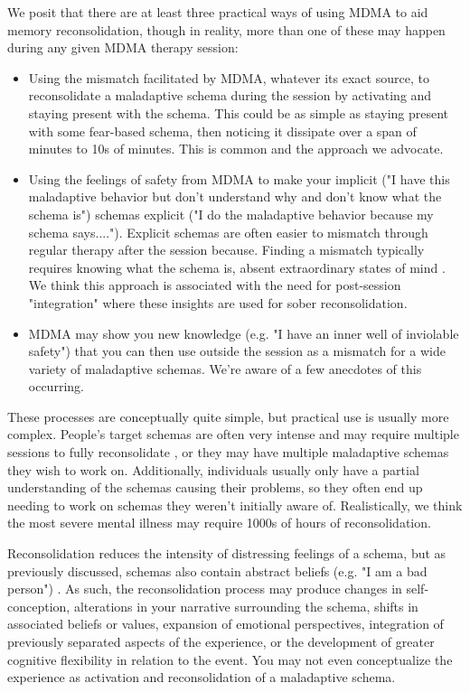 \documentclass[12pt,letterpaper]{book}
\begin{document}
We posit that there are at least three practical ways of using MDMA to aid memory reconsolidation, though in reality, more than one of these may happen during any given MDMA therapy session:
\begin{itemize}
	\item Using the mismatch facilitated by MDMA, whatever its exact source, to reconsolidate a maladaptive schema during the session by activating and staying present with the schema. This could be as simple as staying present with some fear-based schema, then noticing it dissipate over a span of minutes to 10s of minutes. This is common and the approach we advocate.
	\item Using the feelings of safety from MDMA to make your implicit ("I have this maladaptive behavior but don't understand why and don't know what the schema is") schemas explicit ("I do the maladaptive behavior because my schema says...."). Explicit schemas are often easier to mismatch through regular therapy after the session because. Finding a mismatch typically requires knowing what the schema is, absent extraordinary states of mind \cite{eckerUnlocking}. We think this approach is associated with the need for post-session "integration" where these insights are used for sober reconsolidation.
	\item MDMA may show you new knowledge (e.g. "I have an inner well of inviolable safety") that you can then use outside the session as a mismatch for a wide variety of maladaptive schemas. We're aware of a few anecdotes of this occurring.
\end{itemize}
These processes are conceptually quite simple, but practical use is usually more complex. People's target schemas are often very intense and may require multiple sessions to fully reconsolidate \cite{mitchellMDMAClinicalTrial}, or they may have multiple maladaptive schemas they wish to work on. Additionally, individuals usually only have a partial understanding of the schemas causing their problems, so they often end up needing to work on schemas they weren't initially aware of. Realistically, we think the most severe mental illness may require 1000s of hours of reconsolidation.

Reconsolidation reduces the intensity of distressing feelings of a schema, but as previously discussed, schemas also contain abstract beliefs (e.g. "I am a bad person") \cite{laneReconsolidation}. As such, the reconsolidation process may produce changes in self-conception, alterations in your narrative surrounding the schema, shifts in associated beliefs or values, expansion of emotional perspectives, integration of previously separated aspects of the experience, or the development of greater cognitive flexibility in relation to the event. You may not even conceptualize the experience as activation and reconsolidation of a maladaptive schema.
\end{document}
